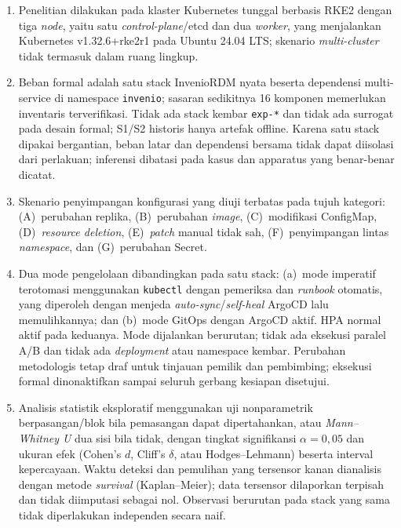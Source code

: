 \begin{enumerate}
  \item Penelitian dilakukan pada klaster Kubernetes tunggal berbasis RKE2 dengan tiga \textit{node}, yaitu satu \textit{control-plane}/etcd dan dua \textit{worker}, yang menjalankan Kubernetes v1.32.6+rke2r1 pada Ubuntu 24.04 LTS; skenario \textit{multi-cluster} tidak termasuk dalam ruang lingkup.
  
  \item Beban formal adalah satu stack InvenioRDM nyata beserta dependensi multi-service di namespace \texttt{invenio}; sasaran sedikitnya 16 komponen memerlukan inventaris terverifikasi. Tidak ada stack kembar \texttt{exp-*} dan tidak ada surrogat pada desain formal; S1/S2 historis hanya artefak offline. Karena satu stack dipakai bergantian, beban latar dan dependensi bersama tidak dapat diisolasi dari perlakuan; inferensi dibatasi pada kasus dan apparatus yang benar-benar dicatat.
  
  \item Skenario penyimpangan konfigurasi yang diuji terbatas pada tujuh kategori: (A)~perubahan replika, (B)~perubahan \textit{image}, (C)~modifikasi ConfigMap, (D)~\textit{resource deletion}, (E)~\textit{patch} manual tidak sah, (F)~penyimpangan lintas \textit{namespace}, dan (G)~perubahan Secret.
  
  \item Dua mode pengelolaan dibandingkan pada satu stack: (a)~mode imperatif terotomasi menggunakan \texttt{kubectl} dengan pemeriksa dan \textit{runbook} otomatis, yang diperoleh dengan menjeda \textit{auto-sync}/\textit{self-heal} ArgoCD lalu memulihkannya; dan (b)~mode GitOps dengan ArgoCD aktif. HPA normal aktif pada keduanya. Mode dijalankan berurutan; tidak ada eksekusi paralel A/B dan tidak ada \textit{deployment} atau namespace kembar. Perubahan metodologis tetap draf untuk tinjauan pemilik dan pembimbing; eksekusi formal dinonaktifkan sampai seluruh gerbang kesiapan disetujui.
  
  \item Analisis statistik eksploratif menggunakan uji nonparametrik berpasangan/blok bila pemasangan dapat dipertahankan, atau \textit{Mann--Whitney U} dua sisi bila tidak, dengan tingkat signifikansi $\alpha = 0{,}05$ dan ukuran efek (Cohen's $d$, Cliff's $\delta$, atau Hodges--Lehmann) beserta interval kepercayaan. Waktu deteksi dan pemulihan yang tersensor kanan dianalisis dengan metode \textit{survival} (Kaplan--Meier); data tersensor dilaporkan terpisah dan tidak diimputasi sebagai nol. Observasi berurutan pada stack yang sama tidak diperlakukan independen secara naif.
  

\end{enumerate}
